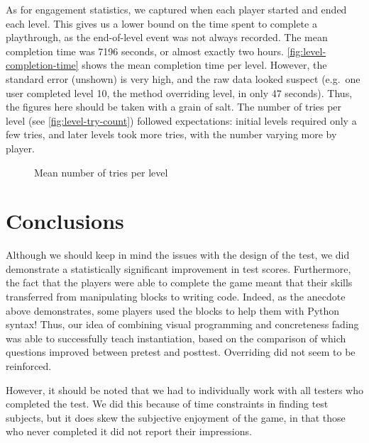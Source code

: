 \documentclass[12pt,notitlepage]{article}
\begin{document}
As for engagement statistics, we captured when each player started and
ended each level. This gives us a lower bound on the time spent to
complete a playthrough, as the end-of-level event was not always
recorded. The mean completion time was 7196 seconds, or almost exactly
two hours. \autoref{fig:level-completion-time} shows the mean
completion time per level. However, the standard error (unshown) is
very high, and the raw data looked suspect (e.g.\ one user completed
level 10, the method overriding level, in only 47 seconds). Thus, the
figures here should be taken with a grain of salt. The number of tries
per level (see \autoref{fig:level-try-count}) followed expectations:
initial levels required only a few tries, and later levels took more
tries, with the number varying more by player.

\begin{figure}
  \centering
  \caption{Mean number of tries per level}\label{fig:level-try-count}
\end{figure}

\section{Conclusions}

Although we should keep in mind the issues with the design of the
test, we did demonstrate a statistically significant improvement in
test scores. Furthermore, the fact that the players were able to
complete the game meant that their skills transferred from
manipulating blocks to writing code. Indeed, as the anecdote above
demonstrates, some players used the blocks to help them with Python
syntax! Thus, our idea of combining visual programming and
concreteness fading was able to successfully teach instantiation,
based on the comparison of which questions improved between pretest
and posttest. Overriding did not seem to be reinforced.

However, it should be noted that we had to individually work with all
testers who completed the test. We did this because of time
constraints in finding test subjects, but it does skew the subjective
enjoyment of the game, in that those who never completed it did not
report their impressions.
\end{document}
